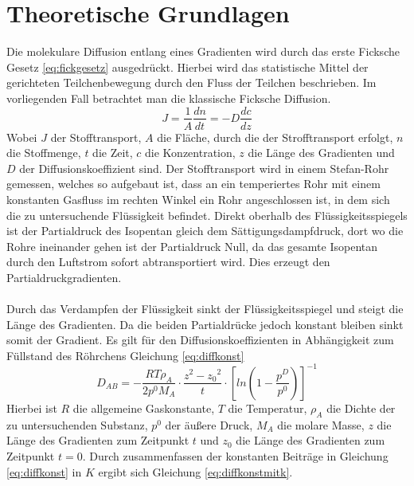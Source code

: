 %
%
\setlength\abovedisplayshortskip{20pt}
\setlength\belowdisplayshortskip{20pt}
\setlength\abovedisplayskip{20pt}
\setlength\belowdisplayskip{20pt}
\section{Theoretische Grundlagen}
Die molekulare Diffusion entlang eines Gradienten wird durch das erste Ficksche Gesetz \ref{eq:fickgesetz} ausgedrückt. Hierbei wird das statistische Mittel der gerichteten Teilchenbewegung durch den Fluss der Teilchen beschrieben. Im vorliegenden Fall betrachtet man die klassische Ficksche Diffusion. 
\begin{equation}
J=\frac{1}{A}\frac{dn}{dt}=-D\frac{dc}{dz}
\label{eq:fickgesetz}
\end{equation}
Wobei $J$ der Stofftransport, $A$ die Fläche, durch die der Strofftransport erfolgt, $n$ die Stoffmenge, $t$ die Zeit, $c$ die Konzentration, $z$ die Länge des Gradienten und $D$ der Diffusionskoeffizient sind. Der Stofftransport wird in einem Stefan-Rohr gemessen, welches so aufgebaut ist, dass an ein temperiertes Rohr mit einem konstanten Gasfluss im rechten Winkel ein Rohr angeschlossen ist, in dem sich die zu untersuchende Flüssigkeit befindet. Direkt oberhalb des Flüssigkeitsspiegels ist der Partialdruck des Isopentan gleich dem Sättigungsdampfdruck, dort wo die Rohre ineinander gehen ist der Partialdruck Null, da das gesamte Isopentan durch den Luftstrom sofort abtransportiert wird. Dies erzeugt den Partialdruckgradienten.\\
\\
Durch das Verdampfen der Flüssigkeit sinkt der Flüssigkeitsspiegel und steigt die Länge des Gradienten. Da die beiden Partialdrücke jedoch konstant bleiben sinkt somit der Gradient.  Es gilt für den Diffusionskoeffizienten in Abhängigkeit zum Füllstand des Röhrchens Gleichung \ref{eq:diffkonst}
\begin{equation}
D_{AB}=-\frac{RT\rho_A}{2p^0M_A}\cdot\frac{z^2-{z_0}^2}{t} \cdot\left[ln\left(1-\frac{p^D}{p^0}\right)\right]^{-1}
\label{eq:diffkonst}
\end{equation}
Hierbei ist $R$ die allgemeine Gaskonstante, $T$ die Temperatur, $\rho_A$ die Dichte der zu untersuchenden Substanz, $p^0$ der äußere Druck, $M_A$ die molare Masse, $z$ die Länge des Gradienten zum Zeitpunkt $t$ und $z_0$ die Länge des Gradienten zum Zeitpunkt $t=0$. Durch zusammenfassen der konstanten Beiträge in Gleichung \ref{eq:diffkonst} in $K$ ergibt sich Gleichung \ref{eq:diffkonstmitk}.
